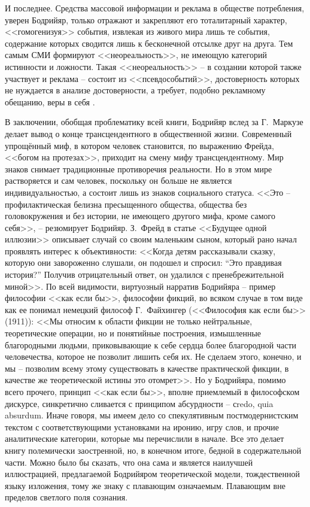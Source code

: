 И последнее. Средства массовой информации и реклама в обществе потребления,
уверен Бодрийяр, только отражают и закрепляют его тоталитарный характер, <<гомогенизуя>>
события, извлекая из живого мира лишь те события, содержание которых сводится лишь
к бесконечной отсылке друг на друга. Тем самым СМИ формируют <<неореальность>>,
не имеющую категорий истинности и ложности. Такая <<неореальность>> -- в создании
которой также участвует и реклама -- состоит из <<псевдособытий>>, достоверность
которых не нуждается в анализе достоверности, а требует, подобно рекламному обещанию,
веры в себя \autocite[][150--166]{bodriyar_society}.

В заключении, обобщая проблематику всей книги, Бодрийяр вслед за Г.~Маркузе делает
вывод о конце трансцендентного в общественной жизни. Современный упрощённый миф,
в котором человек становится, по выражению Фрейда, <<богом на протезах>>,
приходит на смену мифу трансцендентному. Мир знаков снимает традиционные противоречия
реальности. Но в этом мире растворяется и сам человек, поскольку он больше не
является индивидуальностью, а состоит лишь из знаков социального статуса.
<<Это -- профилактическая белизна пресыщенного общества, общества без головокружения
и без истории, не имеющего другого мифа, кроме самого себя>>, -- резюмирует Бодрийяр.
\autocite[][245]{bodriyar_society}
З.~Фрейд в статье <<Будущее одной иллюзии>> описывает случай со своим маленьким
сыном, который рано начал проявлять интерес к объективности: <<Когда детям
рассказывали сказку, которую они завороженно слушали, он подошел и спросил:
``Это правдивая история?'' Получив отрицательный ответ, он удалился с пренебрежительной
миной>>\autocite[][40]{freud1992}. По всей видимости, виртуозный нарратив Бодрийяра --
пример философии <<как если бы>>, философии фикций, во всяком случае в том виде
как ее понимал немецкий философ Г.~Файхингер (<<Философия как если бы>> (1911)):
<<Мы относим к области фикции не только нейтральные, теоретические операции, но
и понятийные построения, измышленные благородными людьми, приковывающие к себе
сердца более благородной части человечества, которое не позволит лишить себя их.
Не сделаем этого, конечно, и мы -- позволим всему этому существовать в качестве
практической фикции, в качестве же теоретической истины это отомрет>>\autocite{freud1992}.
Но у Бодрийяра, помимо всего прочего, принцип <<как если бы>>,
вполне приемлемый в философском дискурсе, синкретично сливается с принципом
абсурдности -- сredo, quia absurdum. Иначе говоря, мы имеем дело со спекулятивным
постмодернистским текстом с соответствующими установками на иронию,
игру слов, и прочие аналитические категории, которые мы перечислили в начале.
Все это делает книгу полемически заостренной, но, в конечном итоге, бедной в
содержательной части. Можно было бы сказать, что она сама и является наилучшей
иллюстрацией, предлагаемой Бодрийяром теоретической модели, тождественной языку
изложения, тому же знаку с плавающим означаемым. Плавающим вне пределов светлого
поля сознания.

